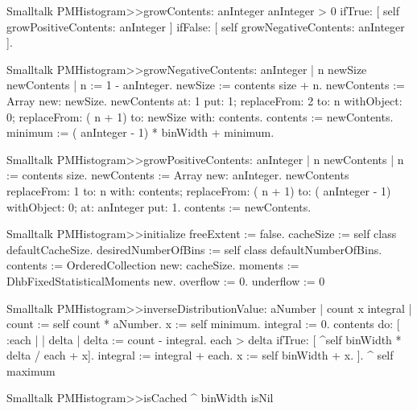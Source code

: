 \begin{displaycode}{Smalltalk}
PMHistogram>>growContents: anInteger
    anInteger > 0
        ifTrue: [ self growPositiveContents: anInteger ]
        ifFalse: [ self growNegativeContents: anInteger ].
\end{displaycode}
      
\begin{displaycode}{Smalltalk}
PMHistogram>>growNegativeContents: anInteger
    | n newSize newContents |
    n := 1 - anInteger.
    newSize := contents size + n.
    newContents := Array new: newSize.
    newContents
            at: 1 put: 1;
            replaceFrom: 2 to: n withObject: 0;
            replaceFrom: ( n + 1) to: newSize with: contents.
    contents := newContents.
    minimum := ( anInteger - 1) * binWidth + minimum.
\end{displaycode}

\begin{displaycode}{Smalltalk}
PMHistogram>>growPositiveContents: anInteger
    | n newContents |
    n := contents size.
    newContents := Array new: anInteger.
    newContents
            replaceFrom: 1 to: n with: contents;
            replaceFrom: ( n + 1) to: ( anInteger - 1) withObject: 0;
            at: anInteger put: 1.
    contents := newContents.
\end{displaycode}
  
\begin{displaycode}{Smalltalk}
PMHistogram>>initialize
    freeExtent := false.
    cacheSize := self class defaultCacheSize.
    desiredNumberOfBins := self class defaultNumberOfBins.
    contents := OrderedCollection new: cacheSize.
    moments := DhbFixedStatisticalMoments new.
    overflow := 0.
    underflow := 0
\end{displaycode}
  
\begin{displaycode}{Smalltalk}
PMHistogram>>inverseDistributionValue: aNumber
    | count x integral |
    count := self count * aNumber.
    x := self minimum.
    integral := 0.
    contents do:
        [ :each | | delta |
          delta := count - integral.
          each > delta
            ifTrue: [ ^self binWidth * delta / each + x].
          integral := integral + each.
          x := self binWidth + x.
        ].
    ^ self maximum
\end{displaycode}
  
\begin{displaycode}{Smalltalk}
PMHistogram>>isCached
    ^ binWidth isNil
\end{displaycode}
    
